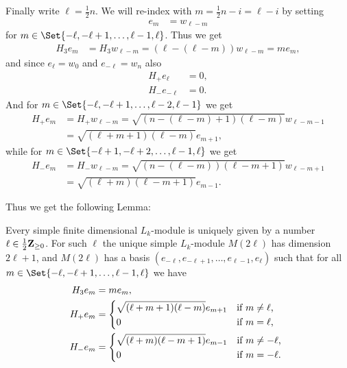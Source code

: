 Finally write $\ell = \tfrac{1}{2}n$. We will re-index with $m=\tfrac{1}{2}n-i=\ell-i$ by setting
\begin{align*}
  e_m &= w_{\ell-m}
\end{align*}
for $m\in\Set{-\ell,-\ell+1,\dotsc,\ell-1,\ell}$. Thus we get
\begin{align*}
  H_3e_m &= H_3w_{\ell-m} = (\ell-(\ell-m))w_{\ell-m} = me_m,
\end{align*}
and since $e_{\ell} = w_0$ and $e_{-\ell} = w_n$ also
\begin{align*}
  H_+e_{\ell} &= 0,\\
  H_-e_{-\ell} &= 0.
\end{align*}
And for $m\in\Set{-\ell,-\ell+1,\dotsc,\ell-2,\ell-1}$ we get
\begin{align*}
  H_+e_m &= H_+w_{\ell-m} = \sqrt{(n-(\ell-m)+1)(\ell-m)}w_{\ell-m-1} \\
  &= \sqrt{(\ell+m+1)(\ell-m)}e_{m+1},
\end{align*}
while for $m\in\Set{-\ell+1,-\ell+2,\dotsc,\ell-1,\ell}$ we get
\begin{align*}
  H_-e_m &= H_-w_{\ell-m} = \sqrt{(n-(\ell-m))(\ell-m+1)}w_{\ell-m+1} \\
  &= \sqrt{(\ell+m)(\ell-m+1)}e_{m-1}.
\end{align*}

Thus we get the following Lemma:
\begin{lemma}\label{lem:modulebasis}
  Every simple finite dimensional $L_k$-module is uniquely given by a number $\ell\in\tfrac{1}{2}\mathbf{Z}_{\geq 0}$. For such $\ell$ the unique simple $L_k$-module $M(2\ell)$ has dimension $2\ell+1$, and $M(2\ell)$ has a basis $(e_{-\ell},e_{-\ell+1},\dotsc,e_{\ell-1},e_\ell)$ such that for all $m\in\Set{-\ell,-\ell+1,\dotsc,\ell-1,\ell}$ we have
  \begin{align}
    \begin{split}
      H_3e_m &= me_m,\label{eq:modulerels} \\
      H_+e_m &=
      \begin{dcases*}
        \sqrt{(\ell+m+1)(\ell-m)}e_{m+1} & if $m\neq \ell$, \\
        0 & if $m=\ell$,
      \end{dcases*} \\
      H_-e_m &=
      \begin{dcases*}
        \sqrt{(\ell+m)(\ell-m+1)}e_{m-1} & if $m\neq -\ell$, \\
        0 & if $m=-\ell$.
      \end{dcases*}
    \end{split}
  \end{align}
\end{lemma}

